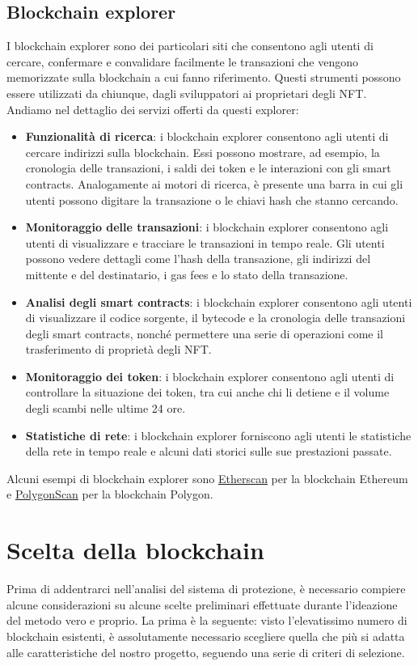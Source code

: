\documentclass[12pt]{report}
\begin{document}
\section{Blockchain explorer}
I blockchain explorer sono dei particolari siti che consentono agli utenti di cercare, confermare e convalidare facilmente le transazioni che vengono memorizzate sulla blockchain a cui fanno riferimento. Questi strumenti possono essere utilizzati da chiunque, dagli sviluppatori ai proprietari degli NFT.\newline
Andiamo nel dettaglio dei servizi offerti da questi explorer:
\begin{itemize}[topsep=5pt, itemsep=0pt]
    \item \textbf{Funzionalità di ricerca}: i blockchain explorer consentono agli utenti di cercare indirizzi sulla blockchain. Essi possono mostrare, ad esempio, la cronologia delle transazioni, i saldi dei token e le interazioni con gli smart contracts. Analogamente ai motori di ricerca, è presente una barra in cui gli utenti possono digitare la transazione o le chiavi hash che stanno cercando.
    \item \textbf{Monitoraggio delle transazioni}: i blockchain explorer consentono agli utenti di visualizzare e tracciare le transazioni in tempo reale. Gli utenti possono vedere dettagli come l'hash della transazione, gli indirizzi del mittente e del destinatario, i gas fees e lo stato della transazione.
    \item \textbf{Analisi degli smart contracts}: i blockchain explorer consentono agli utenti di visualizzare il codice sorgente, il bytecode e la cronologia delle transazioni degli smart contracts, nonché permettere una serie di operazioni come il trasferimento di proprietà degli NFT.
    \item \textbf{Monitoraggio dei token}: i blockchain explorer consentono agli utenti di controllare la situazione dei token, tra cui anche chi li detiene e il volume degli scambi nelle ultime 24 ore.
    \item \textbf{Statistiche di rete}: i blockchain explorer forniscono agli utenti le statistiche della rete in tempo reale e alcuni dati storici sulle sue prestazioni passate. \cite{Nove}
\end{itemize}
Alcuni esempi di blockchain explorer sono \href{https://etherscan.io/}{Etherscan} \cite{Dieci} per la blockchain Ethereum e \href{https://polygonscan.com/}{PolygonScan} \cite{Undici} per la blockchain Polygon.

\chapter{Scelta della blockchain}
\noindent
Prima di addentrarci nell’analisi del sistema di protezione, è necessario compiere alcune considerazioni su alcune scelte preliminari effettuate durante l’ideazione del metodo vero e proprio.\newline
La prima è la seguente: visto l’elevatissimo numero di blockchain esistenti, è assolutamente necessario scegliere quella che più si adatta alle caratteristiche del nostro progetto, seguendo una serie di criteri di selezione.
\end{document}
